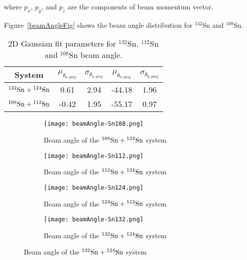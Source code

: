 where $p_x$, $p_y$, and $p_z$ are the components of beam momentum vector.

Figure~\ref{beamAngleFig} shows the beam angle distribution for ${}^{132}$Sn and ${}^{108}$Sn. 


\begin{table}[H]
  \begin{center}
    \begin{tabular}{ccccc}
      \hline 
      System & $\mu_{\theta_\mathrm{a,proj}}$ &
      $\sigma_{\theta_\mathrm{a,proj}}$ & $\mu_{\theta_\mathrm{b,proj}}$ &
      $\sigma_{\theta_\mathrm{b,proj}}$ \\
      \hline\hline 
      ${}^{132}\mathrm{Sn} + {}^{124}\mathrm{Sn}$ & 0.61 & 2.94 & -44.18 & 1.96 \\
      ${}^{108}\mathrm{Sn} + {}^{112}\mathrm{Sn}$ & -0.42 & 1.95 & -55.17 & 0.97 \\
      \hline
    \end{tabular}
    \caption{2D Gaussian fit parameters for $^{132}$Sn, $^{112}$Sn and
      $^{108}$Sn beam angle. \label{beamAngleParameters}}
  \end{center}
\end{table}

\begin{figure}[!htb]
    \centering
    \begin{subfigure}[t]{0.45\textwidth}
        \centering
        \texttt{[image: beamAngle-Sn108.png]} 
        \caption{Beam angle of the ${}^{108}\mathrm{Sn} + {}^{124}\mathrm{Sn}$ system} \label{fig:beamangle108}
    \end{subfigure}
    \hfill
    \begin{subfigure}[t]{0.45\textwidth}
        \centering
        \texttt{[image: beamAngle-Sn112.png]} 
        \caption{Beam angle of the ${}^{112}\mathrm{Sn} + {}^{124}\mathrm{Sn}$ system} \label{fig:beamangle112}
    \end{subfigure}
    
    \begin{subfigure}[t]{0.45\textwidth}
        \centering
        \texttt{[image: beamAngle-Sn124.png]} 
        \caption{Beam angle of the ${}^{124}\mathrm{Sn} + {}^{112}\mathrm{Sn}$ system} \label{fig:beamangle124}
    \end{subfigure}
    \hfill
    \begin{subfigure}[t]{0.45\textwidth}
        \centering
        \texttt{[image: beamAngle-Sn132.png]} 
        \caption{Beam angle of the ${}^{132}\mathrm{Sn} + {}^{124}\mathrm{Sn}$ system} \label{fig:beamangle132}
    \end{subfigure}
\label{fig:beamangle}
\end{figure}



